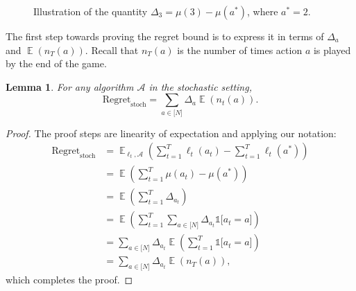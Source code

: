 \documentclass[11pt]{article}
\newtheorem{lemma}{Lemma}
\newcommand{\bN}{\lbrack N \rbrack}
\newcommand{\E}{\mathop{{}\mathbb{E}}}
\newcommand{\A}{ \mathcal{A}}
\begin{document}
\begin{figure}[H]
\centering
{}



\caption{Illustration of the quantity $\Delta_3 = \mu(3) - \mu(a^*)$, where $a^*=2.$ }
\end{figure}

The first step towards proving the regret bound is to express it in terms of $\Delta_a$ and $\E(n_T(a)).$ Recall that $n_T(a)$ is the number of times action $a$ is played by the end of the game.

\begin{lemma}

For any algorithm $\A$ in the stochastic setting,  \[\text{Regret}_\text{stoch} = \sum_{a \in \bN} \Delta_a \E(n_t(a)).\]
\label{regretidentity}
\end{lemma}

\begin{proof}
The proof steps are linearity of expectation and applying our notation:
\begin{align*}
    \text{Regret}_\text{stoch} &= \E_{\ell_t, \mathcal{A}} \left(\sum_{t=1}^T \ell_t(a_t)-\sum_{t=1}^T \ell_t(a^*)\right) \\
    &= \E \left(\sum_{t=1}^T \mu(a_t)-\mu(a^*)\right) \\
    &= \E \left(\sum_{t=1}^T \Delta_{a_t}\right) \\
    &= \E \left(\sum_{t=1}^T \sum_{a \in \bN}  \Delta_{a_t} \mathds{1} \lbrack a_t = a \rbrack \right) \\
    &= \sum_{a \in \bN}  \Delta_{a_t} \E \left(\sum_{t=1}^T \mathds{1} \lbrack a_t = a \rbrack \right) \\
    &= \sum_{a \in \bN}  \Delta_{a_t} \E \left(n_T(a)\right),
\end{align*}
which completes the proof.
\end{proof}
\end{document}
